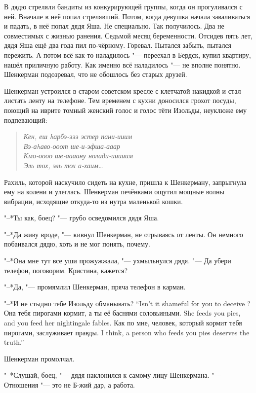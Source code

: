 В дядю стреляли бандиты из конкурирующей группы, когда он прогуливался с ней.
Вначале в неё попал стрелявший.
Потом, когда девушка начала заваливаться и падать, в неё попал дядя Яша.
Не специально.
Так получилось.
Два не совместимых с жизнью ранения.
Седьмой месяц беременности.
Отсидев пять лет, дядя Яша ещё два года пил по-чёрному.
Горевал.
Пытался забыть, пытался пережить.
А потом всё как-то наладилось "--- переехал в Бердск, купил квартиру, нашёл приличную работу.
Как именно всё наладилось "--- не вполне понятно.
Шенкерман подозревал, что не обошлось без старых друзей.

\asterism

Шенкерман устроился в старом советском кресле с клетчатой накидкой и стал листать ленту на телефоне.
Тем временем с кухни доносился грохот посуды, поющий на иврите томный женский голос и голос тёти Изольды, неуклюже ему подпевающий:

\begin{quote}
\textit{
Кен, еш hарбэ-эээ эстер пани-ииим\\
Вэ-аhаво-ооот ше-и-эфша-ааар\\
Кмо-оооо ше-аааану нолади-ииииим\\
Эль тох, эль тох а-хаим\ldots{}
}
\end{quote}

Рахиль, которой наскучило сидеть на кухне, пришла к Шенкерману, запрыгнула ему на колени и улеглась.
Шенкерман печёнками ощутил мощные волны вибрации, исходящие откуда-то из нутра маленькой кошки.

"--*Ты как, боец? "--- грубо осведомился дядя Яша.

"--*Да живу вроде, "--- кивнул Шенкерман, не отрываясь от ленты.
Он немного побаивался дядю, хоть и не мог понять, почему.

"--*Она мне тут все уши прожужжала, "--- ухмыльнулся дядя.
"--- Да убери телефон, поговорим.
Кристина, кажется?

"--*Да, "--- промямлил Шенкерман, пряча телефон в карман.

{"--*И не стыдно тебе Изольду обманывать?}
{``Isn't it shameful for you to deceive \Izolda?}
{Она тебя пирогами кормит, а ты её баснями соловьиными.}
{She feeds you pies, and you feed her nightingale fables.}
{Как по мне, человек, который кормит тебя пирогами, заслуживает правды.}
{I think, a person who feeds you pies deserves the truth.''}

Шенкерман промолчал.

"--*Слушай, боец, "--- дядя наклонился к самому лицу Шенкермана.
"--- Отношения "--- это не Б-жий дар, а работа.

